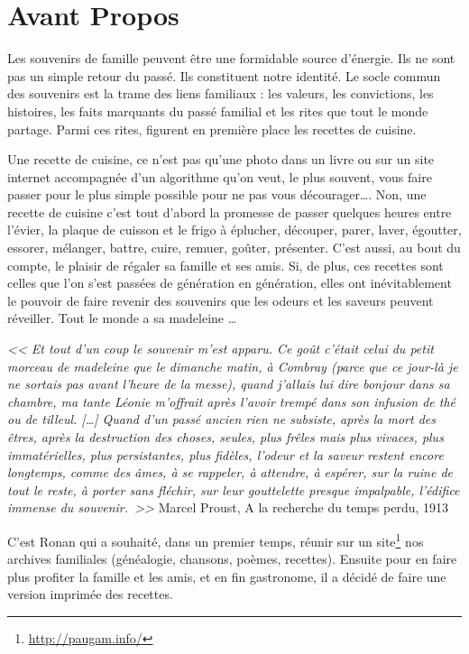 \section*{Avant Propos}
Les souvenirs de famille peuvent être une formidable source d’énergie. Ils ne sont pas un simple retour du passé. Ils constituent notre identité. Le socle commun des souvenirs est la trame des liens familiaux : les valeurs, les convictions, les histoires, les faits marquants du passé familial et les rites que tout le monde partage. Parmi ces rites, figurent en première place les recettes de cuisine. 

Une recette de cuisine, ce n’est pas qu’une photo dans un livre ou sur un site internet accompagnée d’un algorithme qu’on veut, le plus souvent, vous faire passer pour le plus simple possible pour ne pas vous décourager…. Non, une recette de cuisine c’est tout d’abord la promesse de passer quelques heures entre l’évier, la plaque de cuisson et le frigo à éplucher, découper, parer, laver, égoutter, essorer, mélanger, battre, cuire, remuer, goûter, présenter. C’est aussi, au bout du compte, le plaisir de régaler sa famille et ses amis. Si, de plus, ces recettes sont celles que l’on s’est passées de génération en génération, elles ont inévitablement le pouvoir de faire revenir des souvenirs que les odeurs et les saveurs peuvent réveiller. Tout le monde a sa madeleine \ldots{}

\textit{ << Et tout d'un coup le souvenir m'est apparu. Ce goût c'était celui du petit morceau de madeleine que le dimanche matin, à Combray (parce que ce jour-là je ne sortais pas avant l'heure de la messe), quand j'allais lui dire bonjour dans sa chambre, ma tante Léonie m'offrait après l'avoir trempé dans son infusion de thé ou de tilleul. [\ldots{}] Quand d'un passé ancien rien ne subsiste, après la mort des êtres, après la destruction des choses, seules, plus frêles mais plus vivaces, plus immatérielles, plus persistantes, plus fidèles, l'odeur et la saveur restent encore longtemps, comme des âmes, à se rappeler, à attendre, à espérer, sur la ruine de tout le reste, à porter sans fléchir, sur leur gouttelette presque impalpable, l'édifice immense du souvenir. >>}
Marcel Proust, A la recherche du temps perdu, 1913

C’est Ronan qui a souhaité, dans un premier temps, réunir sur un site\footnote{\url{http://paugam.info/}} nos archives familiales (généalogie, chansons, poèmes, recettes). Ensuite pour en faire plus profiter la famille et les amis, et en fin gastronome, il a décidé de faire une version imprimée des recettes. 
      
